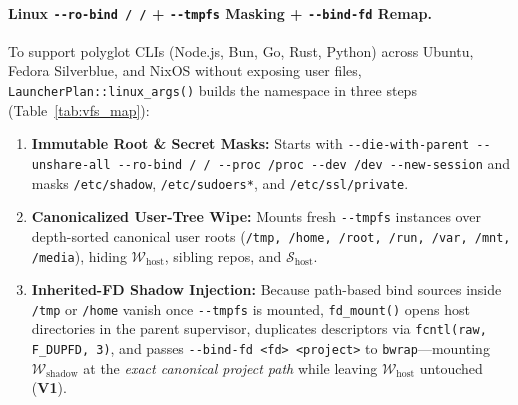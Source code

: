 \documentclass[10pt,twocolumn]{article}
\begin{document}
\paragraph{Linux \texttt{-\/-ro-bind / /} + \texttt{-\/-tmpfs} Masking + \texttt{-\/-bind-fd} Remap.}
To support polyglot CLIs (Node.js, Bun, Go, Rust, Python) across Ubuntu, Fedora Silverblue, and NixOS without exposing user files, \texttt{LauncherPlan::linux\_args()} builds the namespace in three steps (Table~\ref{tab:vfs_map}):
\begin{enumerate}
    \item \textbf{Immutable Root \& Secret Masks:} Starts with \texttt{-\/-die-with-parent -\/-unshare-all -\/-ro-bind / / -\/-proc /proc -\/-dev /dev -\/-new-session} and masks \texttt{/etc/shadow}, \texttt{/etc/sudoers*}, and \texttt{/etc/ssl/private}.
    \item \textbf{Canonicalized User-Tree Wipe:} Mounts fresh \texttt{-\/-tmpfs} instances over depth-sorted canonical user roots (\texttt{/tmp, /home, /root, /run, /var, /mnt, /media}), hiding $\mathcal{W}_{\text{host}}$, sibling repos, and $\mathcal{S}_{\text{host}}$.
    \item \textbf{Inherited-FD Shadow Injection:} Because path-based bind sources inside \texttt{/tmp} or \texttt{/home} vanish once \texttt{-\/-tmpfs} is mounted, \texttt{fd\_mount()} opens host directories in the parent supervisor, duplicates descriptors via \texttt{fcntl(raw, F\_DUPFD, 3)}, and passes \texttt{-\/-bind-fd <fd> <project>} to \texttt{bwrap}---mounting $\mathcal{W}_{\text{shadow}}$ at the \emph{exact canonical project path} while leaving $\mathcal{W}_{\text{host}}$ untouched (\textbf{V1}).
\end{enumerate}
\end{document}
